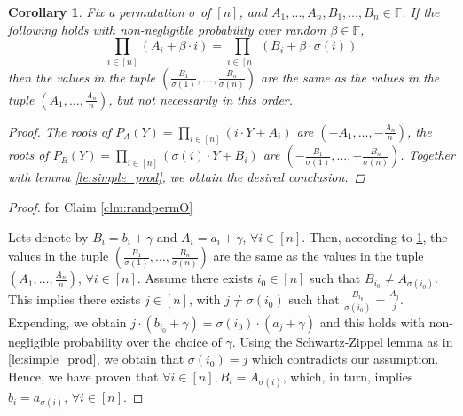 \documentclass[11pt]{article} %
\newcommand{\F}{\ensuremath{\mathbb F}\xspace}
\newtheorem{claim}[lemma]{Claim}
\newtheorem{corollary}[lemma]{Corollary}
\begin{document}
\begin{corollary} \label{co:simple_prod}
Fix a permutation $\sigma$ of $[n]$, and $A_1,\ldots,A_n,B_1,\ldots,B_n \in \F$. If the following holds with non-negligible probability over random $\beta \in \F$, 
 \[\prod_{i\in [n]} (A_i + \beta \cdot i) = \prod_{i\in [n]} (B_i+ \beta \cdot \sigma(i))\] 
 then the values in the tuple $(\frac{B_1}{\sigma(1)}, \ldots, \frac{B_n}{\sigma(n)})$ are the same as the values in the tuple $(A_1, \ldots, \frac{A_n}{n})$, but not necessarily in this order. 
  
\begin{proof} The roots of $P_A(Y) = \prod_{i\in [n]} (i \cdot Y + A_i )$ are $(-A_1, \ldots, -\frac{A_n}{n})$, the roots of $P_B(Y) =  \prod_{i\in [n]} (\sigma (i) \cdot Y + B_i)$ are  $(-\frac{B_1}{\sigma(1)}, \ldots, -\frac{B_n}{\sigma(n)})$. Together with 
lemma \ref{le:simple_prod}, we obtain the desired conclusion.
\end{proof}

\end{corollary}

\begin{proof} for Claim \ref{clm:randpermO}

Lets denote by $B_i = b_i + \gamma$ and $A_i = a_i + \gamma$, $\forall i \in [n]$. Then, according to \ref{co:simple_prod}, the values in the tuple $(\frac{B_1}{\sigma(1)}, \ldots, \frac{B_n}{\sigma(n)})$ are the same as the values in 
the tuple $(A_1, \ldots, \frac{A_n}{n})$, $\forall i \in [n]$. Assume there exists $i_0 \in [n]$ such that $B_{i_0} \neq A_{\sigma(i_0)}$. This implies there exists $j \in [n]$, with $j \neq \sigma(i_0) $ such that $\frac{B_{i_0}}{\sigma(i_0)} = \frac{A_j}{j}$. 
Expending, we obtain $j \cdot (b_{i_0}+ \gamma) = \sigma(i_0) \cdot (a_j + \gamma)$ and this holds with non-negligible probability over the choice of $\gamma$. Using the Schwartz-Zippel lemma as in \ref{le:simple_prod}, 
we obtain that $\sigma(i_0) = j$ which contradicts our assumption. Hence, we have proven that $\forall  i \in [n], B_i = A_{\sigma(i)}$, which, in turn, implies $b_i = a_{\sigma(i)}$, $\forall  i \in [n]$. 
\end{proof}


% 
\end{document}
